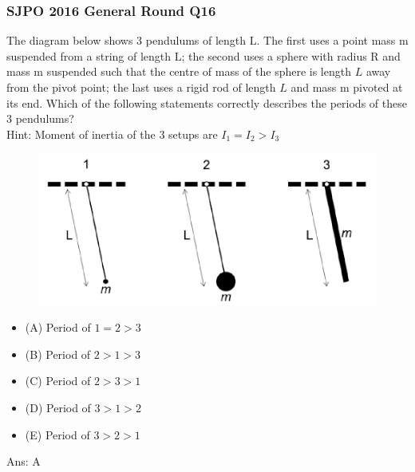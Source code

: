 \documentclass{article}
\begin{document}
\subsubsection{SJPO 2016 General Round Q16}
The diagram below shows 3 pendulums of length $\mathrm{L}$. The first uses a point mass $\mathrm{m}$ suspended from a string of length $\mathrm{L}$; the second uses a sphere with radius $\mathrm{R}$ and mass $\mathrm{m}$ suspended such that the centre of mass of the sphere is length $L$ away from the pivot point; the last uses a rigid rod of length $L$ and mass $\mathrm{m}$ pivoted at its end. Which of the following statements correctly describes the periods of these 3 pendulums?\\
\noindent Hint: Moment of inertia of the 3 setups are $I_1=I_2>I_3$ \\
{
\begin{figure} 
\includegraphics[width=\linewidth]{images/sjpo2016q16.png}
\end{figure}
\begin{itemize}
\item[] (A) Period of $1=2>3$
\item[] (B) Period of $2>1>3$
\item[] (C) Period of $2>3>1$
\item[] (D) Period of $3>1>2$
\item[] (E) Period of $3>2>1$
\end{itemize}
}
Ans: \ifpaper A \fi
\end{document}
